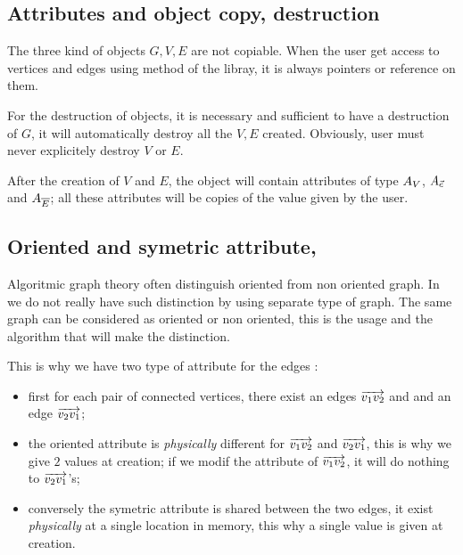 
\subsection{Attributes and object copy, destruction}

The three kind of objects $G,V,E$ are not copiable. When the user get access
to vertices and edges  using method of the libray, it is always pointers or reference
on them. 

For the destruction of objects, it is necessary and sufficient to have a destruction
of $G$, it will automatically destroy all the $V,E$ created.  Obviously,  user must never
explicitely destroy $V$ or $E$.

After the creation of $V$ and $E$, the object will contain attributes  of type $A_V$, $A_{\vec{e}}$ and $A_{\overline{E}}$;
all these attributes will be copies of the value given by the user.


\subsection{Oriented and symetric attribute,}

\label{Gr:Attr:SymOr}

Algoritmic graph theory often distinguish oriented from non oriented graph.  In \PPP  we
do not really have such distinction by using separate type of graph.  The same
graph can be considered as oriented or non oriented, this is the usage
and the algorithm that will make the distinction.

This is why we have two type of attribute for the edges : 

\begin{itemize}
   \item first for each pair of connected vertices, there exist an edges  $\overrightarrow{v_1 v_2}$ and
         and an edge $\overrightarrow{v_2 v_1}$;

   \item the oriented attribute is \emph{physically} different for  $\overrightarrow{v_1 v_2}$
         and $\overrightarrow{v_2 v_1}$,  this is why we give $2$ values at creation;  if we
         modif the attribute of  $\overrightarrow{v_1 v_2}$, it will do nothing to  $\overrightarrow{v_2 v_1}$'s;

   \item conversely the symetric attribute is   shared between the two edges, it exist
         \emph{physically} at a single location in memory,  this why a single value is given at creation.
  
\end{itemize}

